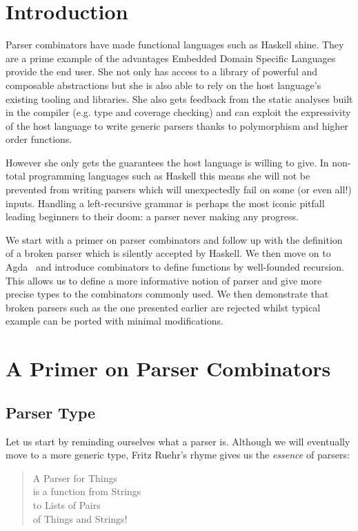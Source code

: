 
\section{Introduction}

Parser combinators have made functional languages such as Haskell
shine. They are a prime example of the advantages Embedded Domain
Specific Languages provide the end user. She not only has access
to a library of powerful and composable abstractions but she is also
able to rely on the host language's existing tooling and libraries.
She also gets feedback from the static analyses built in the compiler
(e.g. type and coverage checking) and can exploit the expressivity
of the host language to write generic parsers thanks to polymorphism
and higher order functions.

However she only gets the guarantees the host language is willing
to give. In non-total programming languages such as Haskell this
means she will not be prevented from writing parsers which will
unexpectedly fail on some (or even all!) inputs. Handling a
left-recursive grammar is perhaps the most iconic pitfall leading
beginners to their doom: a parser never making any progress.

We start with a primer on parser combinators and follow up with the
definition of a broken parser which is silently accepted by Haskell.
We then move on to Agda~\cite{norell2009dependently} and introduce combinators to
define functions by well-founded recursion. This allows us to define
a more informative notion of parser and give more precise types to
the combinators commonly used. We then demonstrate that broken parsers
such as the one presented earlier are rejected whilst typical example
can be ported with minimal modifications.

\section{A Primer on Parser Combinators}

\subsection{Parser Type}

Let us start by reminding ourselves what a parser is. Although we
will eventually move to a more generic type, Fritz Ruehr's rhyme
gives us the \emph{essence} of parsers:

\begin{verse}
  A Parser for Things\\
  is a function from Strings\\
  to Lists of Pairs\\
  of Things and Strings!
\end{verse}


